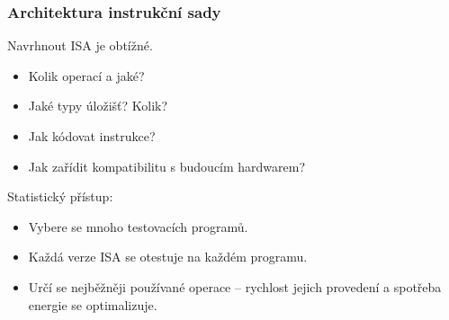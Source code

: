 \documentclass[aspectratio=169,11pt,svgnames,handout]{beamer}
\begin{document}
\begin{frame}
 \frametitle{Architektura instrukční sady}
 Navrhnout ISA je obtížné.
 \begin{itemize}[label=\textbullet]
  \item Kolik operací a jaké?\pause
  \item Jaké typy úložišť? Kolik?\pause
  \item Jak kódovat instrukce?\pause
  \item Jak zařídit kompatibilitu s budoucím hardwarem?\pause
 \end{itemize}
 \alert{Statistický přístup:}
 \begin{itemize}[label=\textbullet]
  \item Vybere se mnoho testovacích programů.\pause
  \item Každá verze ISA se otestuje na každém programu.\pause
  \item Určí se nejběžněji používané operace -- rychlost jejich provedení a
   spotřeba energie se optimalizuje.
 \end{itemize}
\end{frame}
\end{document}
